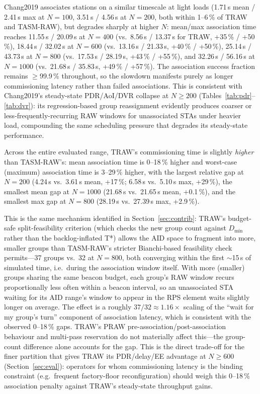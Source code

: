 \documentclass[journal]{IEEEtran}
\begin{document}
Chang2019 associates stations on a similar timescale at light loads
(1.71\,s mean / 2.41\,s max at $N\!=\!100$, 3.51\,s / 4.56\,s at
$N\!=\!200$, both within 1--6\,\% of TRAW and TASM-RAW), but degrades
sharply at higher $N$: mean/max association time reaches
11.55\,s / 20.09\,s at $N\!=\!400$ (vs.\ 8.56\,s / 13.37\,s for TRAW,
+35\,\% / +50\,\%), 18.44\,s / 32.02\,s at $N\!=\!600$ (vs.\
13.16\,s / 21.33\,s, +40\,\% / +50\,\%), 25.14\,s / 43.73\,s at
$N\!=\!800$ (vs.\ 17.53\,s / 28.19\,s, +43\,\% / +55\,\%), and
32.26\,s / 56.16\,s at $N\!=\!1000$ (vs.\ 21.68\,s / 35.83\,s,
+49\,\% / +57\,\%). The association success fraction remains
$\geq$99.9\,\% throughout, so the slowdown manifests purely as longer
commissioning latency rather than failed associations. This is
consistent with Chang2019's steady-state PDR/AoI/DVR collapse at
$N\!\geq\!200$ (Tables~\ref{tab:pdr}--\ref{tab:dvr}): its
regression-based group reassignment evidently produces coarser or
less-frequently-recurring RAW windows for unassociated STAs under
heavier load, compounding the same scheduling pressure that degrades
its steady-state performance.

\label{sec:assoc-tradeoff}
Across the entire evaluated range, TRAW's commissioning time is
slightly \emph{higher} than TASM-RAW's: mean association time is
0--18\,\% higher and worst-case (maximum) association time is
3--29\,\% higher, with the largest relative gap at $N\!=\!200$
(4.24\,s vs.\ 3.61\,s mean, +17\,\%; 6.58\,s vs.\ 5.10\,s max, +29\,\%),
the smallest mean gap at $N\!=\!1000$ (21.68\,s vs.\ 21.65\,s mean,
+0.1\,\%), and the smallest max gap at $N\!=\!800$ (28.19\,s vs.\
27.39\,s max, +2.9\,\%).

This is the same mechanism identified in Section~\ref{sec:contrib}: TRAW's
budget-safe split-feasibility criterion (which checks the new group
count against $D_\mathrm{min}$ rather than the backlog-inflated T*)
allows the AID space to fragment into more, smaller groups than
TASM-RAW's stricter Bianchi-based feasibility check permits---37
groups vs.\ 32 at $N\!=\!800$, both converging within the first
$\sim$15\,s of simulated time, i.e.\ during the association window
itself.
With more (smaller) groups sharing the same beacon budget, each
group's RAW window recurs proportionally less often within a beacon
interval, so an unassociated STA waiting for its AID range's window to
appear in the RPS element waits slightly longer on average.
The effect is a roughly $37/32\!\approx\!1.16\times$ scaling of the
``wait for my group's turn'' component of association latency, which
is consistent with the observed 0--18\,\% gaps.
TRAW's PRAW pre-association/post-association behaviour and
multi-pass reservation do not materially affect this---the group-count
difference alone accounts for the gap.
This is the direct trade-off for the finer partition that gives TRAW
its PDR/delay/EE advantage at $N\!\geq\!600$ (Section~\ref{sec:eval}):
operators for whom commissioning latency is the binding constraint
(e.g.\ frequent factory-floor reconfiguration) should weigh this
0--18\,\% association penalty against TRAW's steady-state throughput
gains.
\end{document}
